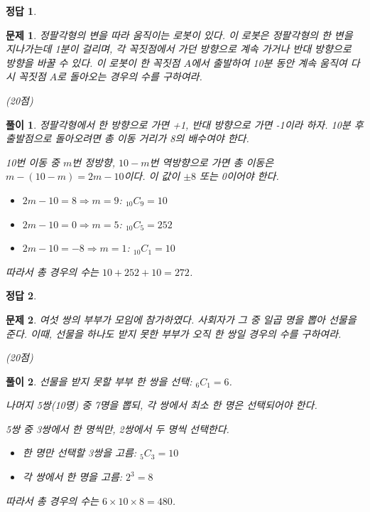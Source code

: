 \documentclass[12pt,a4paper]{article}
\theoremstyle{test_form}
\newtheorem{problem}{문제}[section]
\newtheorem*{solution}{풀이}
\newtheorem*{answer}{정답}
\begin{document}
\begin{answer}
\hfill {}
\end{answer}

\newpage

\begin{problem}
정팔각형의 변을 따라 움직이는 로봇이 있다. 이 로봇은 정팔각형의 한 변을 지나가는데 1분이 걸리며, 각 꼭짓점에서 가던 방향으로 계속 가거나 반대 방향으로 방향을 바꿀 수 있다. 이 로봇이 한 꼭짓점 \(A\)에서 출발하여 10분 동안 계속 움직여 다시 꼭짓점 \(A\)로 돌아오는 경우의 수를 구하여라.
\begin{flushright}(20점)\end{flushright}
\end{problem}

\begin{solution}
    \setlength{\parindent}{0pt}
    정팔각형에서 한 방향으로 가면 +1, 반대 방향으로 가면 -1이라 하자. 10분 후 출발점으로 돌아오려면 총 이동 거리가 8의 배수여야 한다.

10번 이동 중 \(m\)번 정방향, \(10-m\)번 역방향으로 가면 총 이동은 \(m-(10-m)=2m-10\)이다. 이 값이 \(\pm8\) 또는 0이어야 한다. \\

\begin{itemize}
\item \(2m-10=8 \Rightarrow m=9\): \(_{10}C_9=10\)
\item \(2m-10=0 \Rightarrow m=5\): \(_{10}C_5=252\)
\item \(2m-10=-8 \Rightarrow m=1\): \(_{10}C_1=10\)
\end{itemize}

따라서 총 경우의 수는 \(10+252+10=272\).
\end{solution}

\begin{answer}
\hfill {}
\end{answer}

\newpage

\begin{problem}
여섯 쌍의 부부가 모임에 참가하였다. 사회자가 그 중 일곱 명을 뽑아 선물을 준다. 이때, 선물을 하나도 받지 못한 부부가 오직 한 쌍일 경우의 수를 구하여라.
\begin{flushright}(20점)\end{flushright}
\end{problem}

\begin{solution}
    \setlength{\parindent}{0pt}

    선물을 받지 못할 부부 한 쌍을 선택: \( _6 C_1 = 6\).

    나머지 5쌍(10명) 중 7명을 뽑되, 각 쌍에서 최소 한 명은 선택되어야 한다.

    5쌍 중 3쌍에서 한 명씩만, 2쌍에서 두 명씩 선택한다.

\begin{itemize}
\item 한 명만 선택할 3쌍을 고름: \(_5C_3=10\)
\item 각 쌍에서 한 명을 고름: \(2^3=8\)
\end{itemize}

따라서 총 경우의 수는 \(6 \times 10 \times 8 = 480\).
\end{solution}
\end{document}
